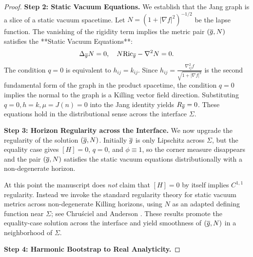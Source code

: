 \begin{proof}
\textbf{Step 2: Static Vacuum Equations.}
We establish that the Jang graph is a slice of a static vacuum spacetime.
Let $N = (1+|\nabla f|^2)^{-1/2}$ be the lapse function. The vanishing of the rigidity term implies the metric pair $(\overline{g}, N)$ satisfies the **Static Vacuum Equations**:
\begin{equation}\label{eq:StaticVacuum}
    \Delta_{\overline{g}} N = 0, \quad N \mathrm{Ric}_{\overline{g}} - \nabla^2 N = 0.
\end{equation}
The condition $q=0$ is equivalent to $h_{ij} = k_{ij}$.
Since $h_{ij} = \frac{\nabla^2_{ij} f}{\sqrt{1+|\nabla f|^2}}$ is the second fundamental form of the graph in the product spacetime, the condition $q=0$ implies the normal to the graph is a Killing vector field direction.
Substituting $q=0, h=k, \mu=J(n)=0$ into the Jang identity yields $R_{\overline{g}} = 0$.
These equations hold in the distributional sense across the interface $\Sigma$.

\textbf{Step 3: Horizon Regularity across the Interface.}
We now upgrade the regularity of the solution $(\overline{g}, N)$. Initially $\overline{g}$ is only Lipschitz across $\Sigma$, but the equality case gives $[H]=0$, $q=0$, and $\phi\equiv1$, so the corner measure disappears and the pair $(\overline{g},N)$ satisfies the static vacuum equations distributionally with a non-degenerate horizon.

At this point the manuscript does \emph{not} claim that $[H]=0$ by itself implies $C^{1,1}$ regularity. Instead we invoke the standard regularity theory for static vacuum metrics across non-degenerate Killing horizons, using $N$ as an adapted defining function near $\Sigma$; see Chru\'sciel \cite{chrusciel1990} and Anderson \cite{anderson2000}. These results promote the equality-case solution across the interface and yield smoothness of $(\overline{g},N)$ in a neighborhood of $\Sigma$.

\textbf{Step 4: Harmonic Bootstrap to Real Analyticity.}


\end{proof}
